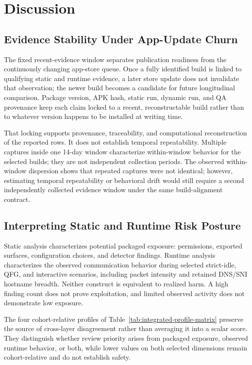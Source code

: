 \section{Discussion}

\subsection{Evidence Stability Under App-Update Churn}

The fixed recent-evidence window separates publication readiness from the continuously changing app-store queue. Once a fully identified build is linked to qualifying static and runtime evidence, a later store update does not invalidate that observation; the newer build becomes a candidate for future longitudinal comparison. Package version, APK hash, static run, dynamic run, and QA provenance keep each claim locked to a recent, reconstructable build rather than to whatever version happens to be installed at writing time.

That locking supports provenance, traceability, and computational reconstruction of the reported rows. It does not establish temporal repeatability. Multiple captures inside one 14-day window characterize within-window behavior for the selected builds; they are not independent collection periods. The observed within-window dispersion shows that repeated captures were not identical; however, estimating temporal repeatability or behavioral drift would still require a second independently collected evidence window under the same build-alignment contract.

\subsection{Interpreting Static and Runtime Risk Posture}

Static analysis characterizes potential packaged exposure: permissions, exported surfaces, configuration choices, and detector findings. Runtime analysis characterizes the observed communication behavior during selected strict-idle, QFG, and interactive scenarios, including packet intensity and retained DNS/SNI hostname breadth. Neither construct is equivalent to realized harm. A high finding count does not prove exploitation, and limited observed activity does not demonstrate low exposure.

The four cohort-relative profiles of Table~\ref{tab:integrated-profile-matrix} preserve the source of cross-layer disagreement rather than averaging it into a scalar score. They distinguish whether review priority arises from packaged exposure, observed runtime behavior, or both, while lower values on both selected dimensions remain cohort-relative and do not establish safety.

